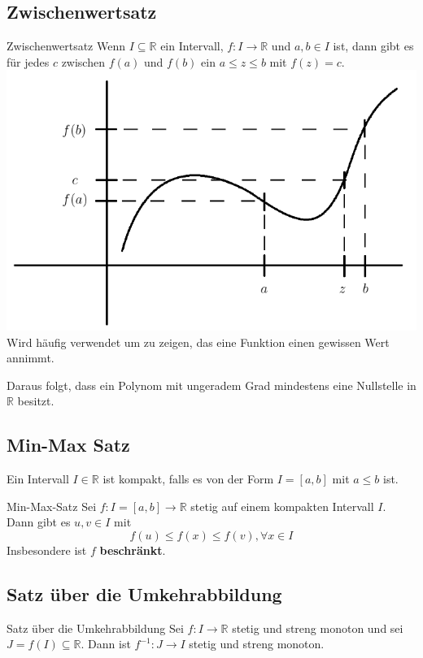 \documentclass[a4paper,8pt]{extarticle}
\def\R{\mathbb{R}}
\begin{document}
\subsection{Zwischenwertsatz}
\begin{mainbox}{Zwischenwertsatz}
 Wenn $I \subseteq \R$ ein Intervall, $f: I \to \R$ und $a, b \in I$ ist, dann gibt es für jedes $c$ zwischen $f(a)$ und $f(b)$ ein $a \le z \le b$ mit $f(z) = c$.
 \includegraphics[width=\linewidth]{zwischenwertsatz.png}
 Wird häufig verwendet um zu zeigen, das eine Funktion einen gewissen Wert annimmt.
\end{mainbox}
Daraus folgt, dass ein Polynom mit ungeradem Grad mindestens eine Nullstelle in $\R$ besitzt.

\subsection{Min-Max Satz}
Ein Intervall $I \in \R$ ist kompakt, falls es von der Form $I = [a,b]$ mit $a \le b$ ist.

\begin{mainbox}{Min-Max-Satz}
 Sei $f: I = [a,b] \to \R$ stetig auf einem kompakten Intervall $I$. Dann gibt es $u, v \in I$ mit $$f(u) \le f(x) \le f(v), \forall x \in I$$ Insbesondere ist $f$ \textbf{beschränkt}.
\end{mainbox}

\subsection{Satz über die Umkehrabbildung}
\begin{mainbox}{Satz über die Umkehrabbildung}
 Sei $f: I \to \R$ stetig und streng monoton und sei $J = f(I) \subseteq \R$. Dann ist $f^{-1}: J \to I$ stetig und streng monoton.
\end{mainbox}
\end{document}
